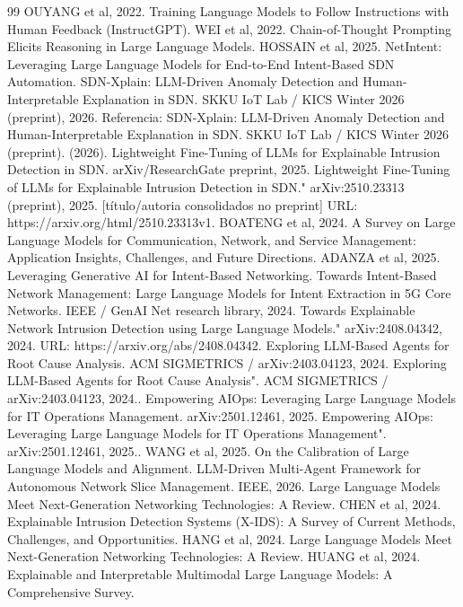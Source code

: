 \documentclass[12pt,a4paper]{article}
\begin{document}
\begin{thebibliography}{99}
 OUYANG et al, 2022. Training Language Models to Follow Instructions with Human Feedback (InstructGPT).
 WEI et al, 2022. Chain-of-Thought Prompting Elicits Reasoning in Large Language Models.
 HOSSAIN et al, 2025. NetIntent: Leveraging Large Language Models for End-to-End Intent-Based SDN Automation.
 SDN-Xplain: LLM-Driven Anomaly Detection and Human-Interpretable Explanation in SDN. SKKU IoT Lab / KICS Winter 2026 (preprint), 2026. Referencia: SDN-Xplain: LLM-Driven Anomaly Detection and Human-Interpretable Explanation in SDN. SKKU IoT Lab / KICS Winter 2026 (preprint). (2026).
 Lightweight Fine-Tuning of LLMs for Explainable Intrusion Detection in SDN. arXiv/ResearchGate preprint, 2025. Lightweight Fine-Tuning of LLMs for Explainable Intrusion Detection in SDN." arXiv:2510.23313 (preprint), 2025. [título/autoria consolidados no preprint] URL: https://arxiv.org/html/2510.23313v1.
 BOATENG et al, 2024. A Survey on Large Language Models for Communication, Network, and Service Management: Application Insights, Challenges, and Future Directions.
 ADANZA et al, 2025. Leveraging Generative AI for Intent-Based Networking.
 Towards Intent-Based Network Management: Large Language Models for Intent Extraction in 5G Core Networks. IEEE / GenAI Net research library, 2024. Towards Explainable Network Intrusion Detection using Large Language Models." arXiv:2408.04342, 2024. URL: https://arxiv.org/abs/2408.04342.
 Exploring LLM-Based Agents for Root Cause Analysis. ACM SIGMETRICS / arXiv:2403.04123, 2024. Exploring LLM-Based Agents for Root Cause Analysis". ACM SIGMETRICS / arXiv:2403.04123, 2024..
 Empowering AIOps: Leveraging Large Language Models for IT Operations Management. arXiv:2501.12461, 2025. Empowering AIOps: Leveraging Large Language Models for IT Operations Management". arXiv:2501.12461, 2025..
 WANG et al, 2025. On the Calibration of Large Language Models and Alignment.
 LLM-Driven Multi-Agent Framework for Autonomous Network Slice Management. IEEE, 2026. Large Language Models Meet Next-Generation Networking Technologies: A Review.
 CHEN et al, 2024. Explainable Intrusion Detection Systems (X-IDS): A Survey of Current Methods, Challenges, and Opportunities.
 HANG et al, 2024. Large Language Models Meet Next-Generation Networking Technologies: A Review.
 HUANG et al, 2024. Explainable and Interpretable Multimodal Large Language Models: A Comprehensive Survey.

\end{thebibliography}
\end{document}
